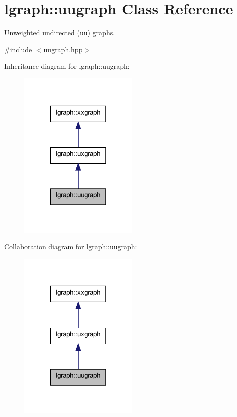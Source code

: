 \hypertarget{classlgraph_1_1uugraph}{\section{lgraph\-:\-:uugraph Class Reference}
\label{classlgraph_1_1uugraph}
}


Unweighted undirected (uu) graphs.  




{\ttfamily \#include $<$uugraph.\-hpp$>$}



Inheritance diagram for lgraph\-:\-:uugraph\-:
\nopagebreak
\begin{figure}[H]
\begin{center}
\leavevmode
\includegraphics[width=162pt]{classlgraph_1_1uugraph__inherit__graph}
\end{center}
\end{figure}


Collaboration diagram for lgraph\-:\-:uugraph\-:
\nopagebreak
\begin{figure}[H]
\begin{center}
\leavevmode
\includegraphics[width=162pt]{classlgraph_1_1uugraph__coll__graph}
\end{center}
\end{figure}
